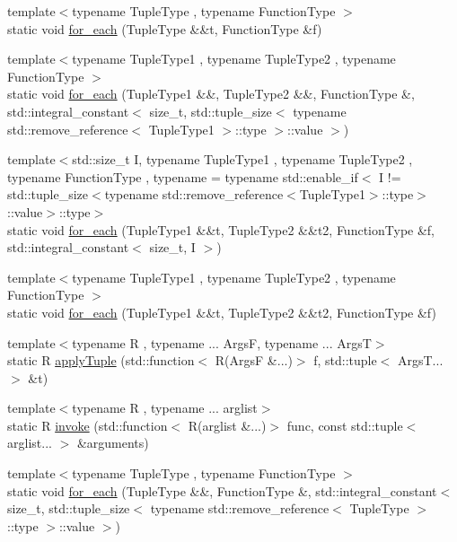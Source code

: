 \begin{DoxyCompactItemize}
\item 
{\footnotesize template$<$typename Tuple\+Type , typename Function\+Type $>$ }\\static void \mbox{\hyperlink{structfakeit_1_1TupleDispatcher_a8fd292a71795aae0aba215dad28ee4c2}{for\+\_\+each}} (Tuple\+Type \&\&t, Function\+Type \&f)
\item 
{\footnotesize template$<$typename Tuple\+Type1 , typename Tuple\+Type2 , typename Function\+Type $>$ }\\static void \mbox{\hyperlink{structfakeit_1_1TupleDispatcher_a30fb1a59df83f4faaa461d3fee4b20bc}{for\+\_\+each}} (Tuple\+Type1 \&\&, Tuple\+Type2 \&\&, Function\+Type \&, std\+::integral\+\_\+constant$<$ size\+\_\+t, std\+::tuple\+\_\+size$<$ typename std\+::remove\+\_\+reference$<$ Tuple\+Type1 $>$\+::type $>$\+::value $>$)
\item 
{\footnotesize template$<$std\+::size\+\_\+t I, typename Tuple\+Type1 , typename Tuple\+Type2 , typename Function\+Type , typename  = typename std\+::enable\+\_\+if$<$            I != std\+::tuple\+\_\+size$<$typename std\+::remove\+\_\+reference$<$\+Tuple\+Type1$>$\+::type$>$\+::value$>$\+::type$>$ }\\static void \mbox{\hyperlink{structfakeit_1_1TupleDispatcher_a42566b7faaac776dc99492e7c0b973b3}{for\+\_\+each}} (Tuple\+Type1 \&\&t, Tuple\+Type2 \&\&t2, Function\+Type \&f, std\+::integral\+\_\+constant$<$ size\+\_\+t, I $>$)
\item 
{\footnotesize template$<$typename Tuple\+Type1 , typename Tuple\+Type2 , typename Function\+Type $>$ }\\static void \mbox{\hyperlink{structfakeit_1_1TupleDispatcher_a1ddb90f24aa73dd61bf2b95c5f176cd5}{for\+\_\+each}} (Tuple\+Type1 \&\&t, Tuple\+Type2 \&\&t2, Function\+Type \&f)
\item 
{\footnotesize template$<$typename R , typename ... ArgsF, typename ... ArgsT$>$ }\\static R \mbox{\hyperlink{structfakeit_1_1TupleDispatcher_ac57ede994f304c03e3982e6fa4d1ca41}{apply\+Tuple}} (std\+::function$<$ R(ArgsF \&...)$>$ f, std\+::tuple$<$ Args\+T... $>$ \&t)
\item 
{\footnotesize template$<$typename R , typename ... arglist$>$ }\\static R \mbox{\hyperlink{structfakeit_1_1TupleDispatcher_a279619fd6d6649c4d99c459a3286469a}{invoke}} (std\+::function$<$ R(arglist \&...)$>$ func, const std\+::tuple$<$ arglist... $>$ \&arguments)
\item 
{\footnotesize template$<$typename Tuple\+Type , typename Function\+Type $>$ }\\static void \mbox{\hyperlink{structfakeit_1_1TupleDispatcher_af22c1fae8c695f722da986df9af411ca}{for\+\_\+each}} (Tuple\+Type \&\&, Function\+Type \&, std\+::integral\+\_\+constant$<$ size\+\_\+t, std\+::tuple\+\_\+size$<$ typename std\+::remove\+\_\+reference$<$ Tuple\+Type $>$\+::type $>$\+::value $>$)

\end{DoxyCompactItemize}
